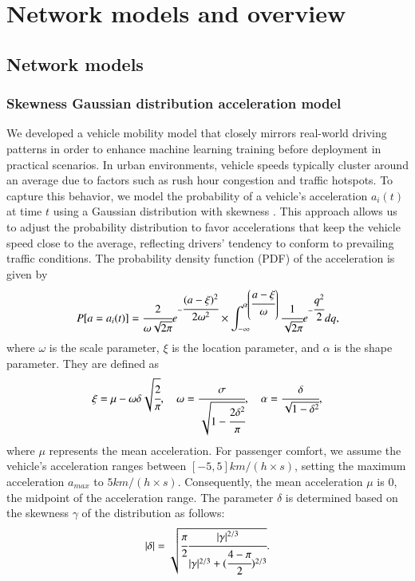 \documentclass{aims}
\numberwithin{equation}{section}
\begin{document}
\section{Network models and overview} \label{sec.nm}
\subsection{Network models}
\subsubsection{Skewness Gaussian distribution acceleration model}
We developed a vehicle mobility model that closely mirrors real-world driving patterns in order to enhance machine learning training before deployment in practical scenarios.
In urban environments, vehicle speeds typically cluster around an average due to factors such as rush hour congestion and traffic hotspots.
To capture this behavior, we model the probability of a vehicle's acceleration $a_{i}(t)$ at time $t$ using a Gaussian distribution with skewness \cite{Azzalini}.
This approach allows us to adjust the probability distribution to favor accelerations that keep the vehicle speed close to the average, reflecting drivers' tendency to conform to prevailing traffic conditions.
The probability density function (PDF) of the acceleration is given by
\begin{equation}
        P[a=a_{i}(t)]=\cfrac{2}{\omega\sqrt{2\pi}} e^{-\cfrac{(a-\xi)^{2}}{2\omega^{2}}}
                \times\int_{-\infty}^{\alpha\left(\cfrac{a-\xi}{\omega}\right)} \cfrac{1}{\sqrt{2\pi}} e^{-\cfrac{q^2}{2}} dq,
\end{equation}
where $\omega$ is the scale parameter, $\xi$ is the location parameter, and $\alpha$ is the shape parameter. They are defined as
\begin{equation} 
    \xi = \mu-\omega\delta\sqrt{\cfrac{2}{\pi}}, \quad
    \omega = \cfrac{\sigma}{\sqrt{1-\cfrac{2\delta^{2}}{\pi}}}, \quad
    \alpha = \cfrac{\delta}{\sqrt{1-\delta^{2}}}, \end{equation}
where $\mu$ represents the mean acceleration.
For passenger comfort, we assume the vehicle's acceleration ranges between $[-5, 5] km/(h\times s)$, setting the maximum acceleration $a_{max}$ to $5 km/(h\times s)$. Consequently, the mean acceleration $\mu$ is 0, the midpoint of the acceleration range.
The parameter $\delta$ is determined based on the skewness $\gamma$ of the distribution as follows:
\begin{equation}
        |\delta| = \sqrt{\cfrac{\pi}{2} \cfrac{|\gamma|^{2/3}}{|\gamma|^{2/3}+(\cfrac{4-\pi}{2})^{2/3}}}.
\end{equation}
\end{document}
